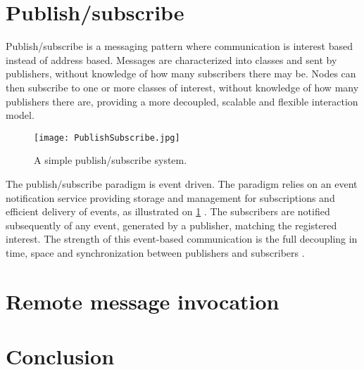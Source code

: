 







\section{Publish/subscribe}

Publish/subscribe is a messaging pattern where communication is interest based instead of address based. Messages are characterized into classes and sent by publishers, without knowledge of how many subscribers there may be. Nodes can then subscribe to one or more classes of interest, without knowledge of how many publishers there are, providing a more decoupled, scalable and flexible interaction model.

\begin{figure}
	\centering
	\texttt{[image: PublishSubscribe.jpg]} 
	\caption[Distributed Computing System with 2 nodes]{
		\label{fig:publishSubscribe} 
		\footnotesize{%
			A simple publish/subscribe system.
		}
	}
\end{figure}

The publish/subscribe paradigm is event driven. The paradigm relies on an event notification service providing storage and management for subscriptions and efficient delivery of events, as illustrated on \cref{fig:publishSubscribe} \cite{eugster2003many}. The subscribers are notified subsequently of any event, generated by a publisher, matching the registered interest. The strength of this event-based communication is the full decoupling in time, space and synchronization between publishers and subscribers \cite{eugster2003many}.




\section{Remote message invocation}


\section{Conclusion}

